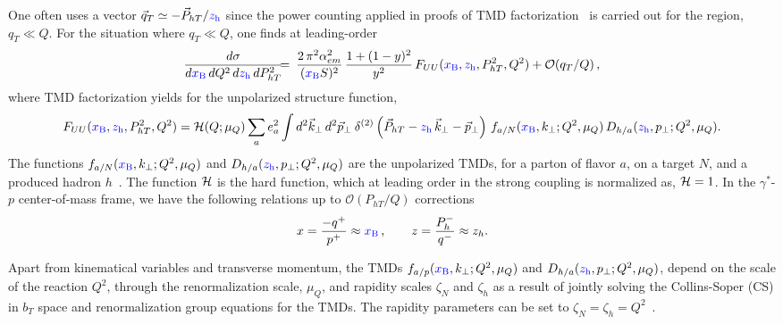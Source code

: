 \documentclass[final,3p,times,onecolumn,sort&compress,hidelinks]{elsarticle}
\newcommand{\xbj}{\ensuremath{{\cbl x_{\rm B}}}}
\newcommand{\zh}{\ensuremath{{\cbl z_{\rm h}}}}
\newcommand\3[1]{\boldsymbol{#1}}
\newcommand{\cbl}{\color{blue}}
\begin{document}
One often uses a vector $\vec{q}_T \simeq -\vec{P}_{hT}/\zh$
 since the power counting applied in proofs of  TMD factorization~\cite{Collins:2011zzd} is carried out for the region, $q_T \ll Q$.
For the situation where $q_{T}\ll Q$, one finds at leading-order~\cite{Bacchetta:2006tn}
\begin{eqnarray}
\frac{d\sigma}
{d\xbj\, dQ^2 \, d\zh \, dP_{hT}^2} &\!\!\!=\!\!\!&
\frac {2 \, \pi^2 \alpha_{em}^2}{(\xbj S)^2} \, \frac{ 1 + (1-y)^2 }{y^2}\,F_{UU}(\xbj,\zh,P_{hT}^2,Q^2) + \mathcal{O}(q_{T}/Q)\, ,
\label{e:dsigma}
\end{eqnarray}
where TMD factorization yields for the unpolarized structure function\cite{Collins:2011zzd},
\begin{equation}
F_{UU}(\xbj,\zh,P_{hT}^2,Q^2)  = {\cal H} (Q; \mu_Q)\sum_{a} e_a^2 
\int d^2\vec{k}_\perp \, d^2\vec{p}_\perp
\> \delta ^{(2)}\left(\vec{P}_{hT} - \zh\,\vec{k}_\perp -\vec{p}_\perp \right)\,
f_{a/N} (\xbj, k_{\perp}; Q^2, \mu_Q) \, D_{h/a}(\zh, p_{\perp}; Q^2, \mu_Q) .
\label{e:FUU} 
\end{equation}
The functions $f_{a/N} (\xbj, k_{\perp}; Q^2, \mu_Q)$ and $D_{h/a}(\zh, p_{\perp}; Q^2, \mu_Q)$ are the unpolarized  TMDs,  for a parton of flavor
$a$, on a  target $N$, and a produced hadron $h$~\cite{Bacchetta:2006tn,Collins:2011zzd}.  The function ${\cal H}$ is the  hard function, which at leading order in the strong coupling
is normalized as, ${\cal H} = 1$.  In the $\gamma^*$-$p$ center-of-mass frame, we have the following relations up to $\mathcal{O}(P_{hT}/Q)$
corrections~\cite{Bacchetta:2006tn}
\begin{equation}
  x=\frac{-q^+}{p^+}\approx \xbj\,, \quad\quad z=\frac{P_h^-}{q^-}\approx z_h.
  \label{e:LT_relations}
\end{equation}







 Apart from kinematical variables and transverse momentum, the TMDs  $f_{a/p} (\xbj, k_{\perp}; Q^2, \mu_Q)$ and $D_{h/a}(\zh, p_{\perp}; Q^2, \mu_Q)$, 
depend on the scale of the reaction $Q^2$,  through  the renormalization scale, $\mu_Q$, and  rapidity scales  $\zeta_N$ and $\zeta_h$ as a result of  jointly solving the Collins-Soper (CS) in $b_T$ space  and renormalization group equations for the TMDs.  The rapidity parameters can be set to $\zeta_N=\zeta_h=Q^2$~\cite{Collins:2011zzd,Collins:2014jpa}.
\end{document}
